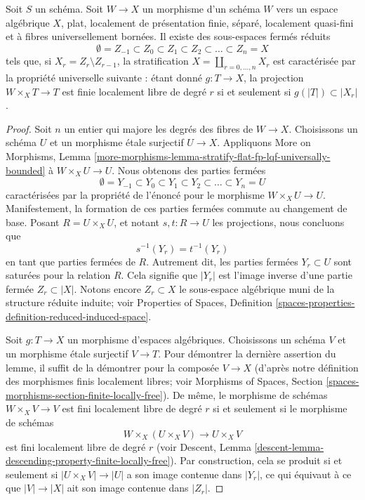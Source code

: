\begin{lemma}
\label{lemma-quasi-compact-reasonable-stratification}
Soit $S$ un schéma. Soit $W \to X$ un morphisme d'un schéma $W$
vers un espace algébrique $X$, plat, localement de présentation finie,
séparé, localement quasi-fini et à fibres universellement bornées. Il existe
des sous-espaces fermés réduits
$$
\emptyset = Z_{-1} \subset Z_0 \subset Z_1 \subset Z_2 \subset
\ldots \subset Z_n = X
$$
tels que, si $X_r = Z_r \setminus Z_{r - 1}$, la stratification
$X = \coprod_{r = 0, \ldots, n} X_r$ est caractérisée par la propriété
universelle suivante : étant donné $g : T \to X$, la projection
$W \times_X T \to T$ est finie localement libre de degré $r$ si et seulement si
$g(|T|) \subset |X_r|$.
\end{lemma}

\begin{proof}
Soit $n$ un entier qui majore les degrés des fibres de $W \to X$.
Choisissons un schéma $U$ et un morphisme étale surjectif $U \to X$.
Appliquons More on Morphisms, Lemma
\ref{more-morphisms-lemma-stratify-flat-fp-lqf-universally-bounded}
à $W \times_X U \to U$. Nous obtenons des parties fermées
$$
\emptyset = Y_{-1} \subset Y_0 \subset Y_1 \subset Y_2 \subset
\ldots \subset Y_n = U
$$
caractérisées par la propriété de l'énoncé pour le morphisme
$W \times_X U \to U$. Manifestement, la formation de ces parties fermées
commute au changement de base. Posant $R = U \times_X U$, et notant
$s, t : R \to U$ les projections, nous concluons que
$$
s^{-1}(Y_r) = t^{-1}(Y_r)
$$
en tant que parties fermées de $R$. Autrement dit, les parties fermées
$Y_r \subset U$ sont saturées pour la relation $R$. Cela signifie que
$|Y_r|$ est l'image inverse d'une partie fermée $Z_r \subset |X|$.
Notons encore $Z_r \subset X$ le sous-espace algébrique muni de la structure
réduite induite; voir Properties of Spaces, Definition
\ref{spaces-properties-definition-reduced-induced-space}.

\medskip\noindent
Soit $g : T \to X$ un morphisme d'espaces algébriques. Choisissons un schéma
$V$ et un morphisme étale surjectif $V \to T$. Pour démontrer la dernière
assertion du lemme, il suffit de la démontrer pour la composée
$V \to X$ (d'après notre définition des morphismes finis localement libres;
voir Morphisms of Spaces, Section
\ref{spaces-morphisms-section-finite-locally-free}).
De même, le morphisme de schémas $W \times_X V \to V$ est fini
localement libre de degré $r$ si et seulement si le morphisme de schémas
$$
W \times_X (U \times_X V)
\longrightarrow
U \times_X V
$$
est fini localement libre de degré $r$ (voir
Descent, Lemma \ref{descent-lemma-descending-property-finite-locally-free}).
Par construction, cela se produit si et seulement si
$|U \times_X V| \to |U|$ a son image contenue dans $|Y_r|$, ce qui équivaut
à ce que $|V| \to |X|$ ait son image contenue dans $|Z_r|$.
\end{proof}

